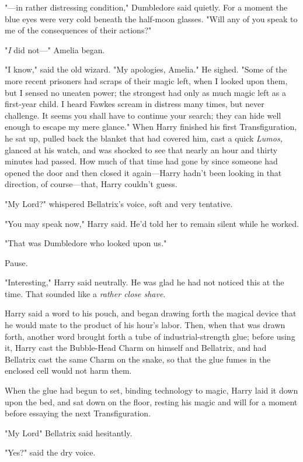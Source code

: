 "---in rather distressing condition," Dumbledore said quietly. For a moment the
blue eyes were very cold beneath the half-moon glasses. "Will any of you speak
to me of the consequences of their actions?"

"\emph{I} did not\mbox{---}" Amelia began.

"I know," said the old wizard. "My apologies, Amelia." He sighed. "Some of the
more recent prisoners had scraps of their magic left, when I looked upon them,
but I sensed no uneaten power; the strongest had only as much magic left as a
first-year child. I heard Fawkes scream in distress many times, but never
challenge. It seems you shall have to continue your search; they can hide well
enough to escape my mere glance."
\sbreak
When Harry finished his first Transfiguration, he sat up, pulled back the
blanket that had covered him, cast a quick \emph{Lumos,} glanced at his watch,
and was shocked to see that nearly an hour and thirty minutes had passed. How
much of that time had gone by since someone had opened the door and then closed
it again---Harry hadn't been looking in that direction, of course---that, Harry
couldn't guess.

"My Lord{\el}?" whispered Bellatrix's voice, soft and very tentative.

"You may speak now," Harry said. He'd told her to remain silent while he worked.

"That was Dumbledore who looked upon us."

Pause.

"Interesting," Harry said neutrally. He was glad he had not noticed this at the
time. That sounded like a \emph{rather close shave}.

Harry said a word to his pouch, and began drawing forth the magical device that
he would mate to the product of his hour's labor. Then, when that was drawn
forth, another word brought forth a tube of industrial-strength glue; before
using it, Harry cast the Bubble-Head Charm on himself and Bellatrix, and had
Bellatrix cast the same Charm on the snake, so that the glue fumes in the
enclosed cell would not harm them.

When the glue had begun to set, binding technology to magic, Harry laid it down
upon the bed, and sat down on the floor, resting his magic and will for a
moment before essaying the next Transfiguration.

"My Lord{\el}" Bellatrix said hesitantly.

"Yes?" said the dry voice.

